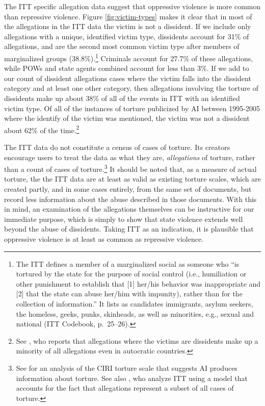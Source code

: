 \documentclass[11pt]{article}
\begin{document}
The ITT specific allegation data suggest that oppressive violence is more common than repressive violence. Figure \ref{fig:victim-types} makes it clear that in most of the allegations in the ITT data the victim is not a dissident. If we include only allegations with a unique, identified victim type, dissidents account for 31\% of allegations, and are the second most common victim type after members of marginalized groups (38.8\%).\footnote{The ITT defines a member of a marginalized social as someone who ``is tortured by the state for the purpose of social control (i.e., humiliation or other punishment to establish that [1] her/his behavior was inappropriate and [2] that the state can abuse her/him with impunity), rather than for the collection of information.'' It lists as candidates immigrants, asylum seekers, the homeless, geeks, punks, skinheads, as well as minorities, e.g., sexual and national (ITT Codebook, p.\ 25--26).} Criminals account for 27.7\% of these allegations, while POWs and state agents combined account for less than 3\%. If we add to our count of dissident allegations cases where the victim falls into the dissident category and at least one other category, then allegations involving the torture of dissidents make up about 38\% of all of the events in ITT with an identified victim type. Of all of the instances of torture publicized by AI between 1995-2005 where the identify of the victim was mentioned, the victim was not a dissident about 62\% of the time.\footnote{See \citet[][pp.\ 3-4]{Haschke2018}, who reports that allegations where the victims are dissidents make up a minority of all allegations even in autocratic countries.} 

The ITT data do not constitute a census of cases of torture. Its creators encourage users to treat the data as what they are, {\em allegations} of torture, rather than a count of cases of torture.\footnote{See \citet{HillMooreMukherjee2013} for an analysis of the CIRI torture scale that suggests AI produces information about torture. See also \citet{ConradHillMoore2018}, who analyze ITT using a model that accounts for the fact that allegations represent a subset of all cases of torture.} It should be noted that, as a measure of actual torture, the the ITT data are at least as valid as existing torture scales, which are created partly, and in some cases entirely, from the same set of documents, but record less information about the abuse described in those documents. With this in mind, an examination of the allegations themselves can be instructive for our immediate purpose, which is simply to show that state violence extends well beyond the abuse of dissidents. Taking ITT as an indication, it is plausible that oppressive violence is at least as common as repressive violence. 
\end{document}
